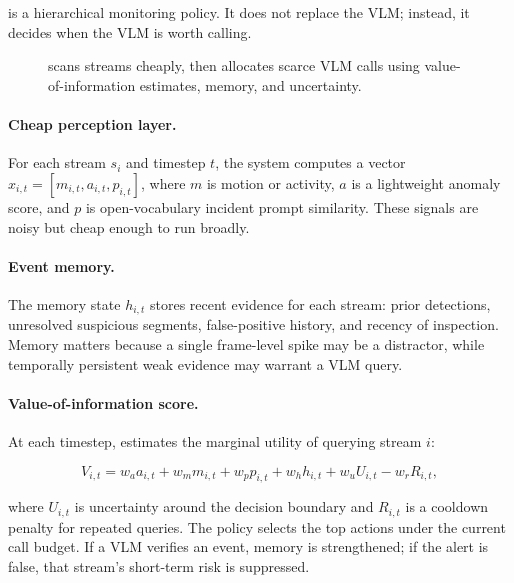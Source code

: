\section{\method}

\method{} is a hierarchical monitoring policy. It does not replace the VLM; instead, it decides when the VLM is worth calling.

\begin{figure}[t]
\centering
\resizebox{0.96\linewidth}{!}{}
\caption{\method{} scans streams cheaply, then allocates scarce VLM calls using value-of-information estimates, memory, and uncertainty.}
\label{fig:architecture}
\end{figure}

\paragraph{Cheap perception layer.}
For each stream $s_i$ and timestep $t$, the system computes a vector
$x_{i,t} = [m_{i,t}, a_{i,t}, p_{i,t}]$, where $m$ is motion or activity, $a$ is a lightweight anomaly score, and $p$ is open-vocabulary incident prompt similarity. These signals are noisy but cheap enough to run broadly.

\paragraph{Event memory.}
The memory state $h_{i,t}$ stores recent evidence for each stream: prior detections, unresolved suspicious segments, false-positive history, and recency of inspection. Memory matters because a single frame-level spike may be a distractor, while temporally persistent weak evidence may warrant a VLM query.

\paragraph{Value-of-information score.}
At each timestep, \method{} estimates the marginal utility of querying stream $i$:

\[
V_{i,t} =
w_a a_{i,t} + w_m m_{i,t} + w_p p_{i,t}
+ w_h h_{i,t}
+ w_u U_{i,t}
- w_r R_{i,t},
\]

where $U_{i,t}$ is uncertainty around the decision boundary and $R_{i,t}$ is a cooldown penalty for repeated queries. The policy selects the top actions under the current call budget. If a VLM verifies an event, memory is strengthened; if the alert is false, that stream's short-term risk is suppressed.

